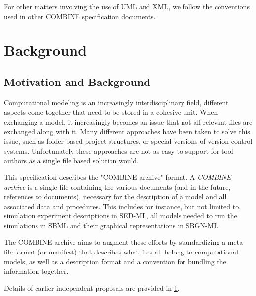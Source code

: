 For other matters involving the use of UML and XML, we follow the 
conventions used in other COMBINE specification documents. 

\section{Background}  \label{background} 

\subsection{ Motivation and Background}

Computational modeling is an increasingly interdisciplinary field, 
different aspects come together that need to be stored in a cohesive 
unit. When exchanging a model, it increasingly becomes an issue that not 
all relevant files are exchanged along with it. Many different 
approaches have been taken to solve this issue, such as folder based 
project structures, or special versions of version control systems. 
Unfortunately these approaches are not as easy to support for tool 
authors as a single file based solution would. 

This specification describes the "COMBINE archive" format. A 
\textit{COMBINE archive} is a single file containing the various 
documents (and in the future, references to documents), necessary for 
the description of a model and all associated data and procedures. This 
includes for instance, but not limited to, simulation experiment 
descriptions in SED-ML, all models needed to run the simulations in SBML 
and their graphical representations in SBGN-ML. 

The COMBINE archive aims to augment these efforts by standardizing a 
meta file format (or manifest) that describes what files all belong to 
computational models, as well as a description format and a convention 
for bundling the information together. 

Details of earlier independent proposals are provided in 
\ref{background}. 

